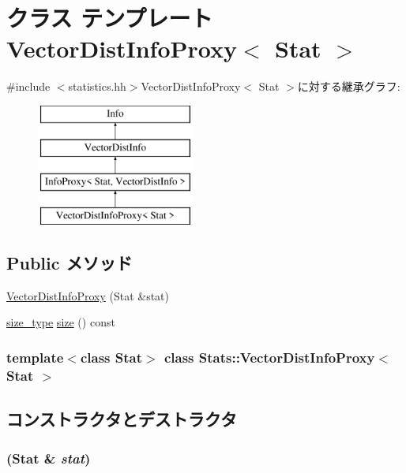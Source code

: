 \hypertarget{classStats_1_1VectorDistInfoProxy}{
\section{クラス テンプレート VectorDistInfoProxy$<$ Stat $>$}
\label{classStats_1_1VectorDistInfoProxy}
}


{\ttfamily \#include $<$statistics.hh$>$}VectorDistInfoProxy$<$ Stat $>$に対する継承グラフ:\begin{figure}[H]
\begin{center}
\leavevmode
\includegraphics[height=4cm]{classStats_1_1VectorDistInfoProxy}
\end{center}
\end{figure}
\subsection*{Public メソッド}
\begin{DoxyCompactItemize}
\item 
\hyperlink{classStats_1_1VectorDistInfoProxy_aad6aec077e18db1623a9a51034d008f4}{VectorDistInfoProxy} (Stat \&stat)
\item 
\hyperlink{namespaceStats_ada51e68d31936547d3729c82daf6b7c6}{size\_\-type} \hyperlink{classStats_1_1VectorDistInfoProxy_a503ab01f6c0142145d3434f6924714e7}{size} () const 
\end{DoxyCompactItemize}
\subsubsection*{template$<$class Stat$>$ class Stats::VectorDistInfoProxy$<$ Stat $>$}



\subsection{コンストラクタとデストラクタ}
\hypertarget{classStats_1_1VectorDistInfoProxy_aad6aec077e18db1623a9a51034d008f4}{
\subsubsection[{VectorDistInfoProxy}]{ (Stat \& {\em stat})}}
\label{classStats_1_1VectorDistInfoProxy_aad6aec077e18db1623a9a51034d008f4}



